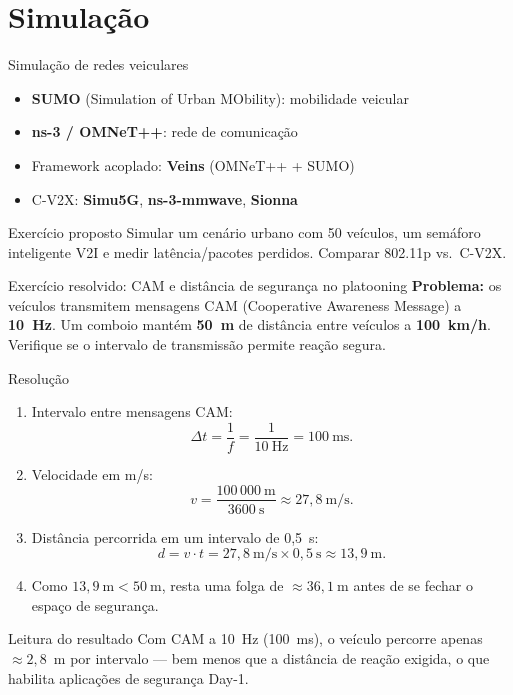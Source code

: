 \documentclass[aspectratio=169,11pt]{beamer}
\begin{document}
\section{Simulação}

\begin{frame}{Simulação de redes veiculares}
  \begin{itemize}
    \item \textbf{SUMO} (Simulation of Urban MObility): mobilidade veicular
    \item \textbf{ns-3 / OMNeT++}: rede de comunicação
    \item Framework acoplado: \textbf{Veins} (OMNeT++ + SUMO)
    \item C-V2X: \textbf{Simu5G}, \textbf{ns-3-mmwave}, \textbf{Sionna}
  \end{itemize}
  \begin{exampleblock}{Exercício proposto}
    Simular um cenário urbano com 50 veículos, um semáforo inteligente V2I e medir latência/pacotes perdidos. Comparar 802.11p vs.\ C-V2X.
  \end{exampleblock}
\end{frame}

\begin{frame}{Exercício resolvido: CAM e distância de segurança no platooning}
  \textbf{Problema:} os veículos transmitem mensagens CAM (Cooperative Awareness Message) a \textbf{10~Hz}. Um comboio mantém \textbf{50~m} de distância entre veículos a \textbf{100~km/h}. Verifique se o intervalo de transmissão permite reação segura.
  \begin{block}{Resolução}
    \begin{enumerate}
      \item Intervalo entre mensagens CAM:
        \[
          \Delta t = \frac{1}{f} = \frac{1}{10~\text{Hz}} = 100~\text{ms}.
        \]
      \item Velocidade em m/s:
        \[
          v = \frac{100\,000~\text{m}}{3600~\text{s}} \approx 27,8~\text{m/s}.
        \]
      \item Distância percorrida em um intervalo de 0,5~s:
        \[
          d = v \cdot t = 27,8~\text{m/s} \times 0,5~\text{s} \approx 13,9~\text{m}.
        \]
      \item Como $13,9~\text{m} < 50~\text{m}$, resta uma folga de $\approx 36,1~\text{m}$ antes de se fechar o espaço de segurança.
    \end{enumerate}
  \end{block}
  \begin{alertblock}{Leitura do resultado}
    Com CAM a 10~Hz (100~ms), o veículo percorre apenas $\approx 2,8$~m por intervalo --- bem menos que a distância de reação exigida, o que habilita aplicações de segurança Day-1.
  \end{alertblock}
\end{frame}
\end{document}

